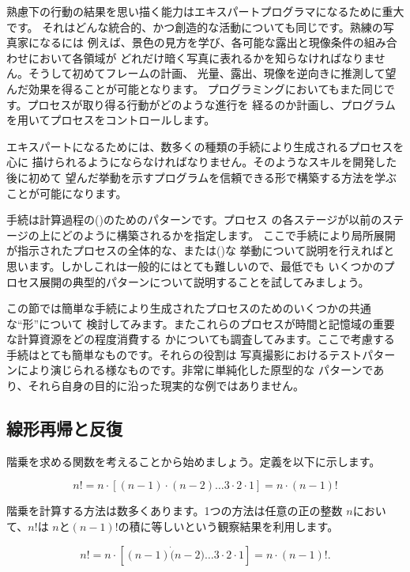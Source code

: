 熟慮下の行動の結果を思い描く能力はエキスパートプログラマになるために重大です。
それはどんな統合的、かつ創造的な活動についても同じです。熟練の写真家になるには
例えば、景色の見方を学び、各可能な露出と現像条件の組み合わせにおいて各領域が
どれだけ暗く写真に表れるかを知らなければなりません。そうして初めてフレームの計画、
光量、露出、現像を逆向きに推測して望んだ効果を得ることが可能となります。
プログラミングにおいてもまた同じです。プロセスが取り得る行動がどのような進行を
経るのか計画し、プログラムを用いてプロセスをコントロールします。


エキスパートになるためには、数多くの種類の手続により生成されるプロセスを心に
描けられるようにならなければなりません。そのようなスキルを開発した後に初めて
望んだ挙動を示すプログラムを信頼できる形で構築する方法を学ぶことが可能になります。



手続は計算過程の()のためのパターンです。プロセス
の各ステージが以前のステージの上にどのように構築されるかを指定します。
ここで手続により局所展開が指示されたプロセスの全体的な、または()な
挙動について説明を行えればと思います。しかしこれは一般的にはとても難しいので、最低でも
いくつかのプロセス展開の典型的パターンについて説明することを試してみましょう。



この節では簡単な手続により生成されたプロセスのためのいくつかの共通な``形''について
検討してみます。またこれらのプロセスが時間と記憶域の重要な計算資源をどの程度消費する
かについても調査してみます。ここで考慮する手続はとても簡単なものです。それらの役割は
写真撮影におけるテストパターンにより演じられる様なものです。非常に単純化した原型的な
パターンであり、それら自身の目的に沿った現実的な例ではありません。


\subsection{線形再帰と反復}
\label{Section 1.2.1}


階乗を求める関数を考えることから始めましょう。定義を以下に示します。

\[
n! = n \cdot [(n - 1)  \cdot (n - 2)  \dots 3 \cdot 2 \cdot 1] = n \cdot (n - 1)!
\]


階乗を計算する方法は数多くあります。1つの方法は任意の正の整数 \( n \)において、\( n! \)は
\( n \)と\( (n - 1)! \)の積に等しいという観察結果を利用します。
\begin{comment}

\begin{example}
n! = n * [(n - 1) * (n - 2) ... 3 * 2 * 1] = n * (n - 1)!
\end{example}

\end{comment}
\begin{displaymath}
n! = n \cdot [(n - 1) \dot (n - 2) \dots 3 \cdot 2 \cdot 1] = n \cdot (n - 1)!.
\end{displaymath}

